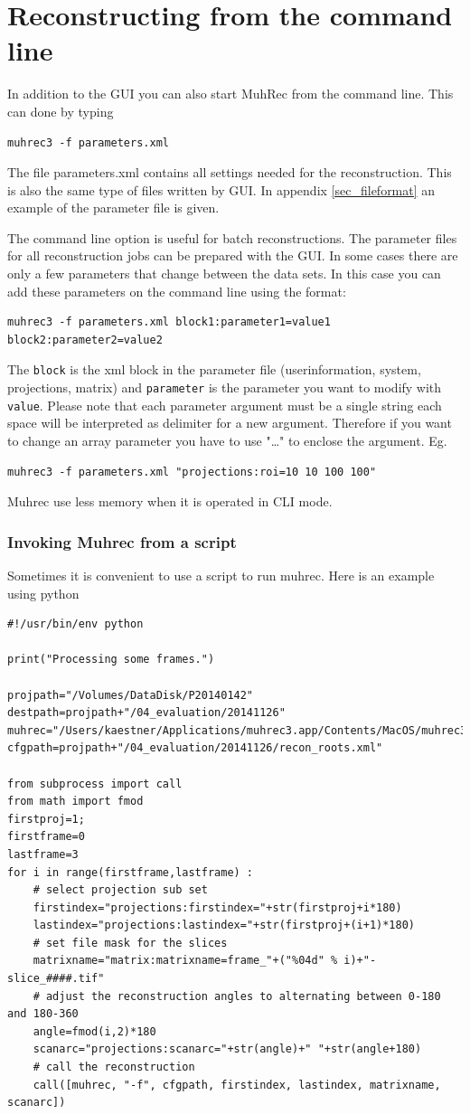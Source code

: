 \documentclass[a4paper]{scrreprt}
\begin{document}
\section{Reconstructing from the command line}\label{sec_cmdline}
In addition to the GUI you can also start MuhRec from the command line. This can done by typing
\begin{verbatim}
muhrec3 -f parameters.xml
\end{verbatim}
The file parameters.xml contains all settings needed for the reconstruction.
This is also the same type of files written by GUI. In appendix
\ref{sec_fileformat} an example of the parameter file is given.

The command line option is useful for batch reconstructions. The parameter files
for all reconstruction jobs can be prepared with the GUI. In some cases there
are only a few parameters that change between the data sets. In this case you can add these parameters on the command line using the format:
\begin{verbatim}
muhrec3 -f parameters.xml block1:parameter1=value1 block2:parameter2=value2 
\end{verbatim}
The \verb+block+ is the xml block in the parameter file (userinformation, system, projections, matrix) and \verb+parameter+ is the parameter you want to modify with \verb+value+.  Please note that each parameter argument must be a single string each space will be interpreted as delimiter for a new argument. Therefore if you want to change an array parameter you have to use "\ldots" to enclose the argument.  Eg.
\begin{verbatim}
muhrec3 -f parameters.xml "projections:roi=10 10 100 100" 
\end{verbatim}
Muhrec use less memory when it is operated in CLI mode. 

\subsubsection{Invoking Muhrec from a script}
Sometimes it is convenient to use a script to run muhrec. Here is an example using python
\begin{verbatim}
#!/usr/bin/env python

print("Processing some frames.")

projpath="/Volumes/DataDisk/P20140142"
destpath=projpath+"/04_evaluation/20141126"
muhrec="/Users/kaestner/Applications/muhrec3.app/Contents/MacOS/muhrec3"
cfgpath=projpath+"/04_evaluation/20141126/recon_roots.xml"

from subprocess import call
from math import fmod
firstproj=1;
firstframe=0
lastframe=3
for i in range(firstframe,lastframe) :
	# select projection sub set
	firstindex="projections:firstindex="+str(firstproj+i*180)
	lastindex="projections:lastindex="+str(firstproj+(i+1)*180)
	# set file mask for the slices
	matrixname="matrix:matrixname=frame_"+("%04d" % i)+"-slice_####.tif"
	# adjust the reconstruction angles to alternating between 0-180 and 180-360
	angle=fmod(i,2)*180 
	scanarc="projections:scanarc="+str(angle)+" "+str(angle+180)
	# call the reconstruction
	call([muhrec, "-f", cfgpath, firstindex, lastindex, matrixname, scanarc])
\end{verbatim}
\end{document}
